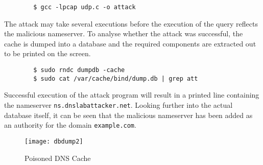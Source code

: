 \documentclass[a4paper,12pt]{article}
\begin{document}
		\begin{verbatim}
		$ gcc -lpcap udp.c -o attack
		\end{verbatim}
		The attack may take several executions before the execution of the query reflects the malicious nameserver. To analyse whether the attack was successful, the cache is dumped into a database and the required components are extracted out to be printed on the screen.
		\begin{verbatim}
		$ sudo rndc dumpdb -cache
		$ sudo cat /var/cache/bind/dump.db | grep att
		\end{verbatim}
		Successful execution of the attack program will result in a printed line containing the nameserver \texttt{ns.dnslabattacker.net}. Looking further into the actual database itself, it can be seen that the malicious nameserver has been added as an authority for the domain \texttt{example.com}.
		\begin{figure}[H]
		\centering
		\texttt{[image: dbdump2]}
		\caption{Poisoned DNS Cache}
		\label{fig:dbdump2}
		\end{figure}
\end{document}
